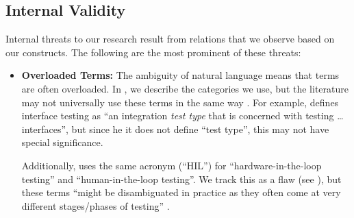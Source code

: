 \clearpage
\subsection{Internal Validity}\label{inter-valid}
Internal threats to our research result from relations that we observe based on
our constructs. The following are the most prominent of these threats:

\begin{itemize}
    \item \textbf{Overloaded Terms:} The ambiguity of natural language means
          that terms are often overloaded. In , we describe
          the categories we use, but the literature may not universally use
          these terms in the same way%
          . For example, \citet[p.~45\ifnotpaper, emphasis added\fi]{Kam2008}
          defines interface testing as ``an integration \emph{test type} that
          is concerned with testing \dots{} interfaces'', but since \ifnotpaper
              he \else it \fi does not define ``test type'', this may not have
          special significance.

          Additionally, \citet[p.~23]{Firesmith2015} uses the same acronym
          (``HIL'') for ``hardware-in-the-loop testing'' and
          ``human-in-the-loop testing''. We track this as a flaw (see
          ), but these terms ``might be disambiguated in
          practice as they often come at very different stages/phases of
          testing'' %
          \PaigeMtgNote. %


\end{itemize}
